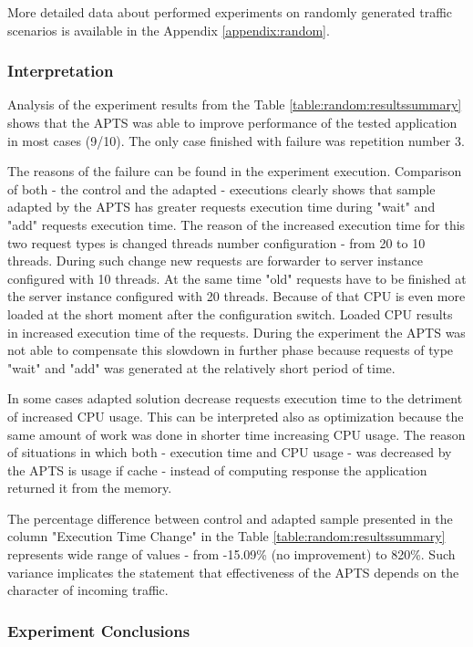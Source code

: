 \documentclass[12pt,a4paper]{article}
\begin{document}
More detailed data about performed experiments on randomly generated traffic scenarios is available in the Appendix \ref{appendix:random}.

\subsubsection{Interpretation}

Analysis of the experiment results from the Table \ref{table:random:resultssummary} shows that the APTS was able to improve performance of the tested application in most cases (9/10).  The only case finished with failure was repetition number 3. 

The reasons of the failure can be found in the experiment execution. Comparison of both - the control and the adapted - executions clearly shows that sample adapted by the APTS has greater requests execution time during "wait" and "add" requests execution time. The reason of the increased execution time for this two request types is changed threads number configuration - from 20 to 10 threads. During such change new requests are forwarder to server instance configured with 10 threads. At the same time "old" requests have to be finished at the server instance configured with 20 threads. Because of that CPU is even more loaded at the short moment after the configuration switch. Loaded CPU results in increased execution time of the requests. During the experiment the APTS was not able to compensate this slowdown in further phase because requests of type "wait" and "add" was generated at the relatively short period of time. 

In some cases adapted solution decrease requests execution time to the detriment of increased CPU usage. This can be interpreted also as optimization because the same amount of work was done in shorter time increasing CPU usage. The reason of situations in which both - execution time and CPU usage - was decreased by the APTS is usage if cache - instead of computing response the application returned it from the memory. 

The percentage difference between control and adapted sample presented in the column "Execution Time Change" in the Table \ref{table:random:resultssummary} represents wide range of values - from -15.09\% (no improvement) to 820\%. Such variance implicates the statement that effectiveness of the APTS depends on the character of incoming traffic.  


\subsubsection{Experiment Conclusions}
\end{document}
